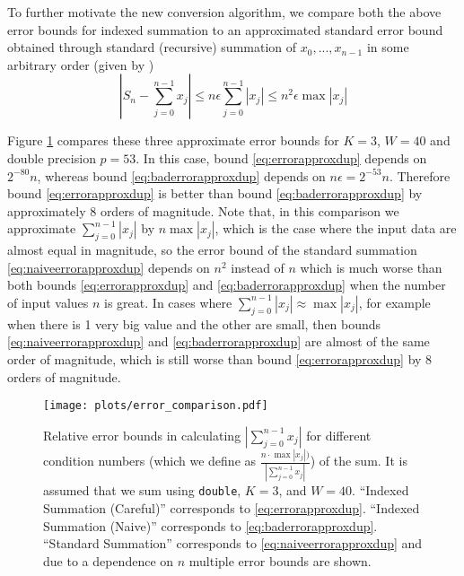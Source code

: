     To further motivate the new conversion algorithm, we compare both the above
    error bounds for indexed summation to an approximated standard error bound
    obtained through standard (recursive) summation of $x_0, ..., x_{n - 1}$ in
    some arbitrary order (given by \cite{higham})
    \begin{equation}
      |S_n - \sum_{j=0}^{n-1}x_j| \leq n \epsilon  \sum\limits_{j = 0}^{n - 1}|x_j| \leq n^2  \epsilon  \max|x_j|
      \label{eq:naiveerrorapproxdup}
    \end{equation}

    Figure \ref{fig:conversionmotivation} compares these three approximate error bounds
    for $K=3$, $W=40$ and double precision $p=53$.
    In this case, bound \eqref{eq:errorapproxdup} depends on $2^{-80}n$,
    whereas bound \eqref{eq:baderrorapproxdup} depends on $n\epsilon = 2^{-53}n$.
    Therefore bound \eqref{eq:errorapproxdup} is better than bound \eqref{eq:baderrorapproxdup}
    by approximately 8 orders of magnitude.
    Note that, in this comparison we approximate $\sum_{j=0}^{n-1} |x_j|$ by $n \max |x_j|$,
    which is the case where the input data are almost equal in magnitude,
    so the error bound of the standard summation \eqref{eq:naiveerrorapproxdup} depends
    on $n^2$ instead of $n$ which is much worse than both bounds
    \eqref{eq:errorapproxdup} and \eqref{eq:baderrorapproxdup}
    when the number of input values $n$ is great.
    In cases where $\sum_{j=0}^{n-1} |x_j| \approx \max |x_j|$, for example
    when there is 1 very big value and the other are small, then bounds
    \eqref{eq:naiveerrorapproxdup} and \eqref{eq:baderrorapproxdup} are almost
    of the same order of magnitude, which is still worse than bound \eqref{eq:errorapproxdup}
    by 8 orders of magnitude.

\begin{figure}[H]
\begin{center}
\texttt{[image: plots/error\_comparison.pdf]}
\caption{Relative error bounds in calculating $|\sum \limits_{j = 0}^{n - 1}
x_j|$ for different condition numbers (which we define as $\frac{n \cdot \max
|x_j|)}{|\sum \limits_{j = 0}^{n - 1} x_j|}$) of the sum. It is assumed that we
sum using \texttt{double}, $K = 3$, and $W = 40$. ``Indexed Summation
(Careful)'' corresponds to \eqref{eq:errorapproxdup}. ``Indexed Summation
(Naive)'' corresponds to \eqref{eq:baderrorapproxdup}. ``Standard Summation''
corresponds to \eqref{eq:naiveerrorapproxdup} and due to a dependence on $n$
multiple error bounds are shown.}
\label{fig:conversionmotivation}
\end{center}
\end{figure}

